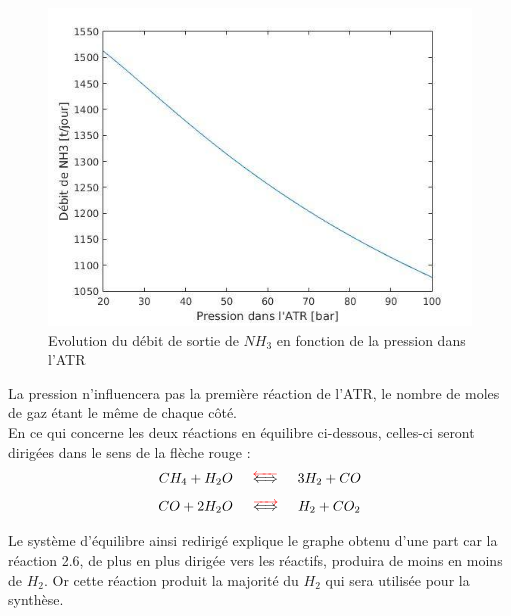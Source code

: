 \documentclass[12pt]{report}
\begin{document}
\begin{figure}[H]
\begin{center}
\includegraphics[scale=0.6]{debit_NH3_pression_ATR}
\caption{Evolution du débit de sortie de $NH_3$ en fonction de la pression dans l'ATR}
\end{center}
\end{figure}

La pression n'influencera pas la première réaction de l'ATR, le nombre de moles de gaz étant le même de chaque côté.\\

En ce qui concerne les deux réactions en équilibre ci-dessous, celles-ci seront dirigées dans le sens de la flèche rouge :\\

 \begin{equation}
 CH_4 + H_2O \hspace{0.5cm}\textcolor{red}{\overleftarrow{\textcolor{black}{\Longleftrightarrow}}} \hspace{0.5cm} 3H_2 + CO
 \end{equation}
 \begin{equation}
 CO + 2H_2O \hspace{0.5cm}\textcolor{red}{\overrightarrow{\textcolor{black}{\Longleftrightarrow}}} \hspace{0.5cm} H_2 + CO_2
 \end{equation}
 
 Le système d'équilibre ainsi redirigé explique le graphe obtenu d'une part car la réaction 2.6, de plus en plus dirigée vers les réactifs, produira de moins en moins de $H_2$. Or cette réaction produit la majorité du $H_2$ qui sera utilisée pour la synthèse.\\
 
\end{document}

